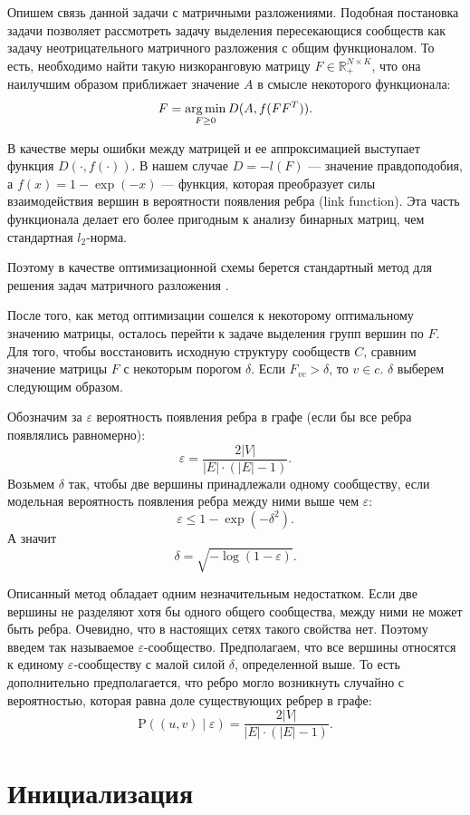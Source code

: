 \documentclass{ITaSconf}
\newcommand{\argmin}{\mathop{\rm arg\,min}\limits}
\def\PP{\mathrm{P}}
\begin{document}
Опишем связь данной задачи с матричными разложениями.
Подобная постановка задачи позволяет рассмотреть задачу выделения пересекающися сообществ как задачу неотрицательного матричного разложения с общим функционалом.
То есть, необходимо найти такую низкоранговую матрицу $F\in \mathbb{R}_{+}^{N \times K}$, что она наилучшим образом приближает значение $A$ в смысле некоторого функционала:
$$ F = \argmin_{F\ge 0} D(A, f(F F^T)). $$

В качестве меры ошибки между матрицей и ее аппроксимацией выступает функция $D(\cdot, f(\cdot))$. В нашем случае
$D = -l(F)$ --- значение правдоподобия, а $f(x) = 1 - \exp(-x)$ --- функция, которая преобразует силы взаимодействия вершин в вероятности появления ребра (link function). Эта часть функционала делает его более пригодным к анализу бинарных матриц, чем стандартная $l_2$-норма.

Поэтому в качестве оптимизационной схемы берется стандартный метод для решения задач матричного разложения \cite{lin2007projected}.

После того, как метод оптимизации сошелся к некоторому оптимальному значению матрицы, осталось перейти к задаче выделения групп вершин по $F$.
Для того, чтобы восстановить исходную структуру сообществ $C$, сравним значение матрицы $F$ с некоторым порогом $\delta$. Если $F_{vc} > \delta$, то $v \in c$. $\delta$ выберем следующим образом.

Обозначим за $\varepsilon$ вероятность появления ребра в графе (если бы все ребра появлялись равномерно): 
$$\varepsilon = \dfrac{2|V|}{|E|\cdot (|E|-1)}.$$ 
Возьмем $\delta$ так, чтобы две вершины принадлежали одному сообществу, если модельная вероятность появления ребра между ними выше чем $\varepsilon$:
$$\varepsilon \le 1-\exp(-\delta^2).$$
А значит
$$\delta = \sqrt{-\log(1-\varepsilon)}. $$

Описанный метод обладает одним незначительным недостатком.
Если две вершины не разделяют хотя бы одного общего сообщества, между ними не может быть ребра.  
Очевидно, что в настоящих сетях такого свойства нет.
Поэтому введем так называемое $\varepsilon$-сообщество.
Предполагаем, что все вершины относятся к единому $\varepsilon$-сообществу с малой силой $\delta$, определенной выше.
То есть дополнительно предполагается, что ребро могло возникнуть случайно с вероятностью, которая равна доле существующих ребрер в графе:
$$ \PP((u,v)\mid \varepsilon) = \dfrac{2|V|}{|E| \cdot \left( |E| - 1 \right)}.$$

\section{Инициализация}
\end{document}
